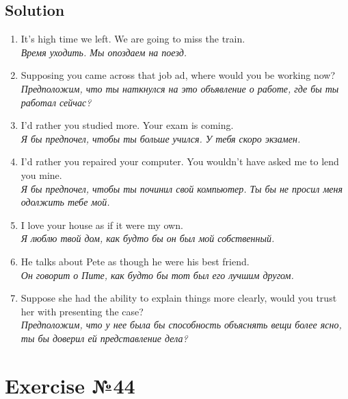\subsection*{Solution}
\begin{enumerate}
      \item It’s high time we left. We are going to miss the train.\\
            \textit{Время уходить. Мы опоздаем на поезд.}

      \item Supposing you came across that job ad, where would you be working now?\\
            \textit{Предположим, что ты наткнулся на это объявление о работе, где бы ты работал сейчас?}

      \item I’d rather you studied more. Your exam is coming.\\
            \textit{Я бы предпочел, чтобы ты больше учился. У тебя скоро экзамен.}

      \item I’d rather you repaired your computer. You wouldn’t have asked me to lend you mine.\\
            \textit{Я бы предпочел, чтобы ты починил свой компьютер. Ты бы не просил меня одолжить тебе мой.}

      \item I love your house as if it were my own.\\
            \textit{Я люблю твой дом, как будто бы он был мой собственный.}

      \item He talks about Pete as though he were his best friend.\\
            \textit{Он говорит о Пите, как будто бы тот был его лучшим другом.}

      \item Suppose she had the ability to explain things more clearly, would you trust her with presenting the case?\\
            \textit{Предположим, что у нее была бы способность объяснять вещи более ясно, ты бы доверил ей представление дела?}
\end{enumerate}

\section{Exercise №44}
